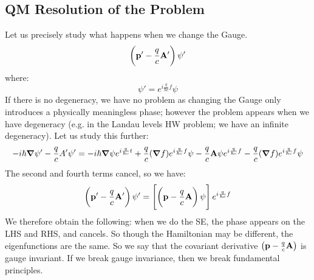 \subsection{QM Resolution of the Problem}
Let us precisely study what happens when we change the Gauge.
\begin{equation}
    \left(\mathbf{p}' - \frac{q}{c}\mathbf{A}'\right)\psi'
\end{equation}
where:
\begin{equation}
    \psi' = e^{i\frac{q}{\hbar c}f}\psi
\end{equation}
If there is no degeneracy, we have no problem as changing the Gauge only introduces a physically meaningless phase; however the problem appears when we have degeneracy (e.g. in the Landau levels HW problem; we have an infinite degeneracy). Let us study this further:
\begin{equation}
    -i\hbar \nabla \psi' - \frac{q}{c}A'\psi' = -i\hbar \nabla\psi e^{i\frac{q}{\hbar c}t} + \frac{q}{c}(\nabla f)e^{i\frac{q}{\hbar c}f}\psi - \frac{q}{c}\v{A}\psi e^{i\frac{q}{\hbar c}f} - \frac{q}{c}(\nabla f)e^{i \frac{q}{\hbar c}f}\psi
\end{equation}
The second and fourth terms cancel, so we have:
\begin{equation}
    \left(\mathbf{p}' - \frac{q}{c}\mathbf{A}'\right)\psi' = \left[\left(\mathbf{p} - \frac{q}{c}\mathbf{A}\right)\psi\right]e^{i\frac{q}{\hbar c}f}
\end{equation}
We therefore obtain the following: when we do the SE, the phase appears on the LHS and RHS, and cancels. So though the Hamiltonian may be different, the eigenfunctions are the same. So we say that the covariant derivative $\left(\mathbf{p} - \frac{q}{c}\mathbf{A}\right)$ is gauge invariant. If we break gauge invariance, then we break fundamental principles.

